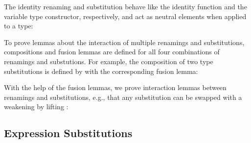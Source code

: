 \documentclass[acmsmall,anonymous,review,screen]{acmart}
\newenvironment{AgdaBlock}{%
  \vspace{\AgdaEmptySkip}%
  \AgdaNoSpaceAroundCode{}%
}{%
  \AgdaSpaceAroundCode{}
}
\begin{document}
\noindent\hspace{-\fboxsep}
\begin{minipage}{0.5\linewidth}
  \SubDefTren
\end{minipage}
\begin{minipage}{0.5\linewidth}
  \SubDefTsub
\end{minipage}

The identity renaming {\ATidR} and substitution
{\ATidS} behave like the identity function and the variable
type constructor, respectively, and act as neutral elements when applied to a type:

\noindent\hspace{-\fboxsep}
\begin{minipage}{0.5\linewidth}
  \begin{AgdaBlock}
    \SubDefTidR
    \TFTidRNeutral
  \end{AgdaBlock}
\end{minipage}
\begin{minipage}{0.5\linewidth}
  \begin{AgdaBlock}
    \SubDefTidS
    \TFTidSNeutral
  \end{AgdaBlock}
\end{minipage}



To prove lemmas about the interaction of multiple renamings and substitutions,
compositions and fusion lemmas are defined for all four combinations
of renamings and substutions.
For example, the composition of two type substitutions is defined by
\SubstExamplesTCompSS
with the corresponding fusion lemma:
\SubstExamplesFusionTSubTSub

With the help of the fusion lemmas, we prove interaction lemmas
between renamings and substitutions, e.g., that any substitution
 can be swapped with a weakening  by lifting :
\TFSwapTsubTwk



\subsection{Expression Substitutions}
\label{sec:substitutions:expr}
\end{document}
